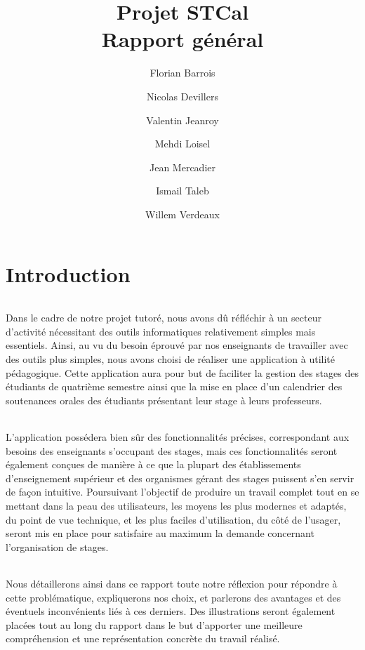 \documentclass[a4paper,10pt]{report}
\date{}
\title{\Huge{Projet STCal}\\ {\Large Rapport général}}
\author{Florian Barrois \and Nicolas Devillers \and Valentin Jeanroy \and Mehdi Loisel \and Jean Mercadier \and Ismail Taleb \and Willem Verdeaux}
\begin{document}
\maketitle
\strut
\renewcommand{\contentsname}{Sommaire}
\tableofcontents

\part{Introduction}
  \paragraph{}
    Dans le cadre de notre projet tutoré, nous avons dû réfléchir à un secteur d'activité nécessitant des outils informatiques relativement simples mais essentiels. 
    Ainsi, au vu du besoin éprouvé par nos enseignants de travailler avec des outils plus simples, nous avons choisi de réaliser une application à utilité pédagogique.
    Cette application aura pour but de faciliter la gestion des stages des étudiants de quatrième semestre ainsi que la mise en place d'un calendrier des soutenances orales des étudiants présentant leur stage à leurs professeurs.

  \paragraph{}
    L'application possédera bien sûr des fonctionnalités précises, correspondant aux besoins des enseignants s'occupant des stages, mais ces fonctionnalités seront également conçues de manière à ce que la plupart des établissements d'enseignement supérieur et des organismes gérant des stages puissent s'en servir de façon intuitive. 
    Poursuivant l'objectif de produire un travail complet tout en se mettant dans la peau des utilisateurs, les moyens les plus modernes et adaptés, du point de vue technique, et les plus faciles d'utilisation, du côté de l'usager, seront mis en place pour satisfaire au maximum la demande concernant l'organisation de stages. 

  \paragraph{}
    Nous détaillerons ainsi dans ce rapport toute notre réflexion pour répondre à cette problématique, expliquerons nos choix, et parlerons des avantages et des éventuels inconvénients liés à ces derniers.  
    Des illustrations seront également placées tout au long du rapport dans le but d'apporter une meilleure compréhension et une représentation concrète du travail réalisé.
\end{document}
